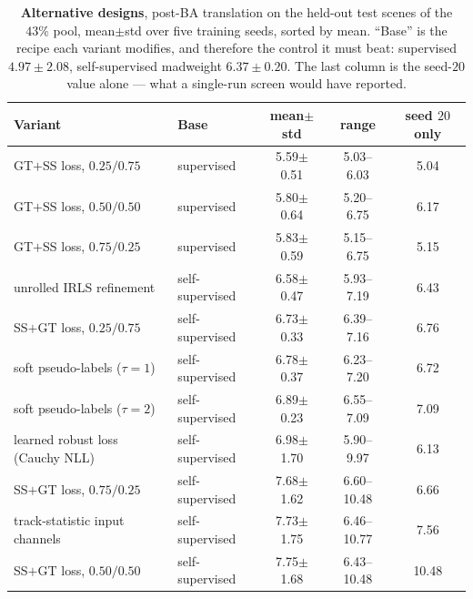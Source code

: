 \documentclass{article}
\newcommand{\mad}{madweight}
\begin{document}
\begin{table}[h]\centering\footnotesize
\caption{\textbf{Alternative designs}, post-BA translation on the held-out test scenes of
the $43\%$ pool, mean$\pm$std over five training seeds, sorted by mean. ``Base'' is the
recipe each variant modifies, and therefore the control it must beat: supervised
$4.97\pm2.08$, self-supervised \mad{} $6.37\pm0.20$. The last column is the seed-$20$
value alone --- what a single-run screen would have reported.}
\label{tab:altdesigns}
\setlength{\tabcolsep}{4pt}%
\begin{tabular}{llccc}
\toprule
Variant & Base & mean$\pm$std & range & seed $20$ only\\
\midrule
GT$+$SS loss, $0.25/0.75$ & supervised & 5.59$\pm$0.51 & 5.03--6.03 & 5.04\\
GT$+$SS loss, $0.50/0.50$ & supervised & 5.80$\pm$0.64 & 5.20--6.75 & 6.17\\
GT$+$SS loss, $0.75/0.25$ & supervised & 5.83$\pm$0.59 & 5.15--6.75 & 5.15\\
unrolled IRLS refinement & self-supervised & 6.58$\pm$0.47 & 5.93--7.19 & 6.43\\
SS$+$GT loss, $0.25/0.75$ & self-supervised & 6.73$\pm$0.33 & 6.39--7.16 & 6.76\\
soft pseudo-labels ($\tau{=}1$) & self-supervised & 6.78$\pm$0.37 & 6.23--7.20 & 6.72\\
soft pseudo-labels ($\tau{=}2$) & self-supervised & 6.89$\pm$0.23 & 6.55--7.09 & 7.09\\
learned robust loss (Cauchy NLL) & self-supervised & 6.98$\pm$1.70 & 5.90--9.97 & 6.13\\
SS$+$GT loss, $0.75/0.25$ & self-supervised & 7.68$\pm$1.62 & 6.60--10.48 & 6.66\\
track-statistic input channels & self-supervised & 7.73$\pm$1.75 & 6.46--10.77 & 7.56\\
SS$+$GT loss, $0.50/0.50$ & self-supervised & 7.75$\pm$1.68 & 6.43--10.48 & 10.48\\
\bottomrule
\end{tabular}
\end{table}
\end{document}
